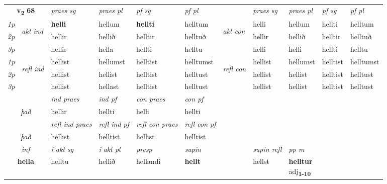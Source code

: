 \noindent
\begin{tabular}{lllllllllll} \toprule
\multicolumn{2}{c}{\textbf{v{\textsubscript{2}}} \Large{\textbf{68}}}  &  \textit{praes sg}  & \textit{praes pl}  &\textit{ pf sg} & \textit{pf pl} &  &  \textit{praes sg}  & \textit{praes pl}  & \textit{pf sg} & \textit{pf pl } \\*
	\cmidrule{3-6} \cmidrule{8-11}
 {\textit{1p}} & \multirow{3}{*}{\begin{turn}{90}\textit{akt ind}\end{turn}} & \textbf{helli} & hellum & \textbf{hellti} & helltum & \multirow{3}{*}{\begin{turn}{90}\textit{akt con}\end{turn}} &helli & hellum & hellti & helltum\\*
 {\textit{2p}} &  &  hellir  & hellið & helltir & helltuð & & hellir & hellið & helltir & helltuð \\*
{\textit{3p}} &  & hellir & hella & hellti & helltu & & helli & helli& hellti & helltu \\*
\cmidrule{3-6} \cmidrule{8-11}
 {\textit{1p}} & \multirow{3}{*}{\begin{turn}{90}\textit{refl ind}\end{turn}}  & hellist & hellumst & helltist & helltumst & \multirow{3}{*}{\begin{turn}{90}\textit{refl con}\end{turn}}  &hellist & hellumst & helltist & helltumst \\*
 {\textit{2p}} &  & hellist & hellist & helltist & helltust & &hellist & hellist & helltist & helltust \\*
 {\textit{3p}}  & & hellist & hellast & helltist & helltust & & hellist & hellist& helltist & helltust \\*
\cmidrule{3-6} \cmidrule{8-11}

   & &  \textit{ind praes} & \textit{ind pf} & \textit{con praes} & \textit{con pf} \\*
\multicolumn{2}{c}{ \textit{það} } & hellir & hellti & helli & hellti \\*

\cmidrule{3-6}
 & & \textit{refl ind praes} & \textit{refl ind pf} & \textit{refl con praes} & \textit{refl con pf} \\*
 \multicolumn{2}{c}{ \textit{það} }& hellist & helltist & hellist & helltist \\*

\cmidrule{3-9}
   \multicolumn{2}{c}{\textit{inf}}  & \textit{i akt sg} & \textit{i akt pl}   & \textit{presp} & \textit{supin} && \textit{supin refl} & \textit{pp m} \\*
  \multicolumn{2}{c}{\textbf{hella}} & helltu  & hellið   & hellandi &  \textbf{hellt} && hellst & \specialcell{\textbf{helltur} \\ adj\textbf{\textsubscript{1-10}}} \\*
\end{tabular}

